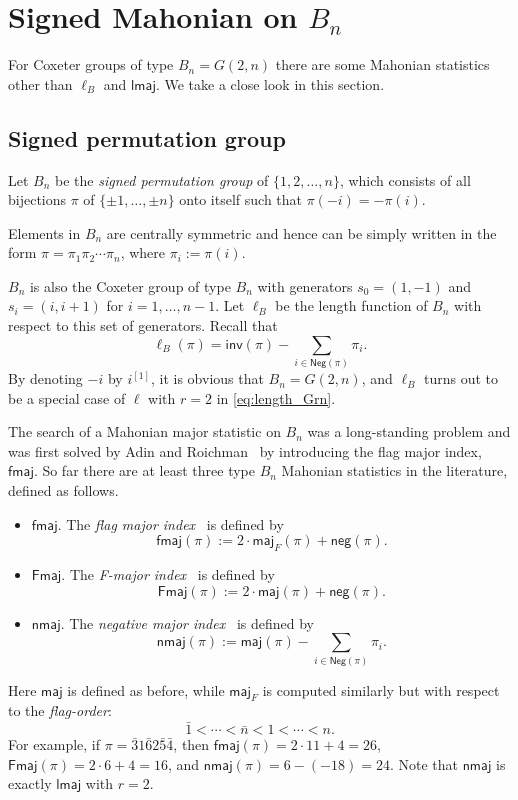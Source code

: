 \documentclass[a4paper, reqno, 11pt]{amsart}
\newcommand{\maj}{{\textsf{maj}}}
\newcommand{\inv}{{\textsf{inv}}}
\newcommand{\Nega}{{\textsf{Neg}}}
\newcommand{\nega}{{\textsf{neg}}}
\newcommand{\fmaj}{{\textsf{fmaj}}}
\newcommand{\Fmaj}{{\textsf{Fmaj}}}
\newcommand{\nmaj}{{\textsf{nmaj}}}
\newcommand{\lmaj}{{\textsf{lmaj}}}
\numberwithin{equation}{section}
\begin{document}
\section{Signed Mahonian on $B_n$}\label{sec:Bn}
For Coxeter groups of type $B_n=G(2,n)$ there are some Mahonian statistics other than $\ell_B$ and $\lmaj$.
We take a close look in this section.


\subsection{Signed permutation group}\label{Sec:Bn_Bn}

Let $B_n$ be the \emph{signed permutation group} of $\{1,2,\ldots,n\}$, which consists of all bijections $\pi$ of $\{\pm 1,\ldots,\pm n\}$ onto itself such that $\pi(-i)=-\pi(i)$. 

Elements in $B_n$ are centrally symmetric and hence can be simply written in the form $\pi=\pi_1\pi_2\cdots\pi_n$, where $\pi_i:=\pi(i)$.

$B_n$ is also the Coxeter group of type $B_n$ with generators $s_0=(1,-1)$ and $s_i=(i,i+1)$ for $i=1,\ldots,n-1$. 
Let $\ell_B$ be the length function of $B_n$ with respect to this set of generators. 
Recall that 
$$\ell_B(\pi)=\inv(\pi)-\sum_{i\in\Nega(\pi)}\pi_i.$$
By denoting $-i$ by $i^{[1]}$, it is obvious that $B_n=G(2,n)$, and $\ell_B$ turns out to be a special case of $\ell$ with $r=2$ in \eqref{eq:length_Grn}.

The search of a Mahonian major statistic on $B_n$ was a long-standing problem and was first solved by Adin and Roichman~\cite{Adin_Roichman_01} by introducing the flag major index, $\fmaj$.
So far there are at least three type $B_n$ Mahonian statistics in the literature, defined as follows.
\begin{itemize}
\item $\fmaj$. The \emph{flag major index}~\cite{Adin_Roichman_01} is defined by
$$\fmaj(\pi):=2\cdot\maj_F(\pi)+\nega(\pi).$$
\item $\Fmaj$. The \emph{F-major index}~\cite{Adin_Roichman_01} is defined by
$$\Fmaj(\pi):=2\cdot\maj(\pi)+\nega(\pi).$$
\item $\nmaj$. The \emph{negative major index}~\cite{Adin_Brenti_Roichman_01} is defined by
$$\nmaj(\pi):=\maj(\pi)-\sum_{i\in \Nega(\pi)}\pi_i.$$
\end{itemize}
Here $\maj$ is defined as before, while $\maj_F$ is computed similarly but with respect to the \emph{flag-order}:
$$\bar{1}<\cdots<\bar{n}<1<\cdots<n.$$
For example, if $\pi=\bar{3}1\bar{6}2\bar{5}\bar{4}$, then $\fmaj(\pi)=2\cdot 11+4=26$, $\Fmaj(\pi)=2\cdot 6+4=16$, and $\nmaj(\pi)=6-(-18)=24$.
Note that $\nmaj$ is exactly $\lmaj$ with $r=2$.
\end{document}
